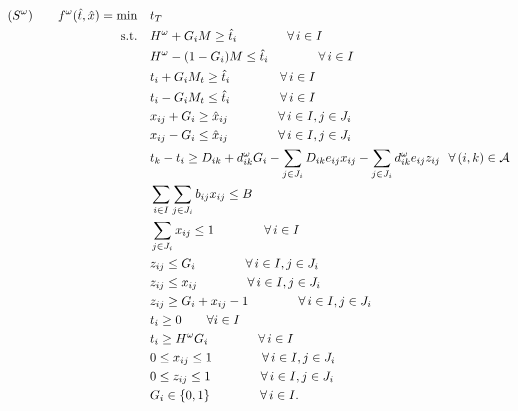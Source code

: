 \documentclass[11pt]{article}
\newcommand{\cA}{{\cal A}}
\begin{document}
	\begin{subequations}
		\label{prob:subOri}
		\begin{align}
		(S^\omega) \qquad 
		f^\omega(\hat{t},\hat{x}) = \min \quad & t_T \\
		\text{s.t.} \quad & H^\omega + G_i M \geq \hat{t}_i \qquad \qquad \forall \,i \in I \label{cons:sG1}\\
		& H^\omega - (1 - G_i) M \leq \hat{t}_i \qquad \qquad \forall \,i \in I \label{cons:sG2}\\
		& t_i + G_i M_t \geq \hat{t}_i \qquad \qquad \forall \,i \in I \label{cons:stG1}\\
		& t_i - G_i M_t \leq \hat{t}_i \qquad \qquad \forall \,i \in I \label{cons:stG2}\\
		& x_{ij} + G_i \geq \hat{x}_{ij} \qquad \qquad \forall \,i \in I, j \in J_i \label{cons:sxG1}\\
		& x_{ij} - G_i \leq \hat{x}_{ij} \qquad \qquad \forall \,i \in I, j \in J_i \label{cons:sxG2}\\
		& t_k - t_i \geq D_{ik} + d_{ik}^\omega G_i -\sum_{j \in J_i} D_{ik} e_{ij} x_{ij} - \sum_{j \in J_i} d_{ik}^\omega e_{ij} z_{ij} %
		\ \ 
		\forall \, (i,k) \in \cA \label{cons:subSep}\\
		& \sum_{i \in I}\sum_{j \in J_i} b_{ij}x_{ij} \leq B  \label{cons:subBudget}\\
		& \sum_{j \in J_i} x_{ij} \leq 1 \qquad \qquad \forall \,i \in I \label{cons:subBudget1}\\
		& z_{ij} \leq G_i \qquad \qquad \forall \,i \in I, j \in J_i \label{cons:sublinearize1}\\
		& z_{ij} \leq x_{ij} \qquad \qquad \forall \,i \in I, j \in J_i \label{cons:sublinearize2}\\
		& z_{ij} \geq G_i + x_{ij} - 1 \qquad \qquad \forall \,i \in I, j \in J_i \label{cons:sublinearize3}\\
		& {t_i \ge 0} \quad \quad \forall i \in I \\
		& t_i \geq H^\omega G_i \qquad \qquad \forall\, i \in I \label{cons:subH}\\
		& 0 \leq x_{ij} \leq 1 \qquad \qquad \forall \,i \in I, j \in J_i\\
		& 0 \leq z_{ij} \leq 1 \qquad \qquad \forall \,i \in I, j \in J_i \label{cons:subzbounds}\\
		& G_i \in \{0,1\} \qquad \qquad \forall \,i \in I. \label{cons:subInt}
		\end{align}
	\end{subequations}
\end{document}
